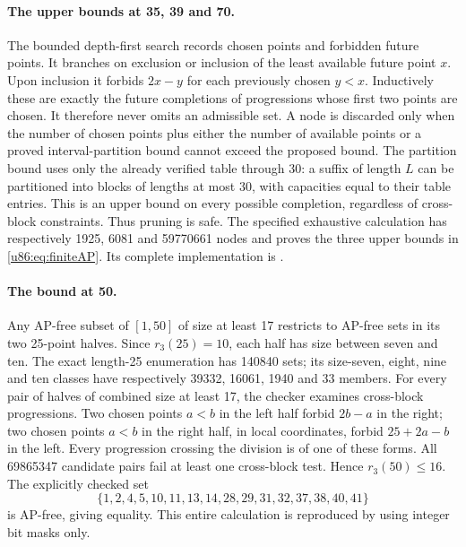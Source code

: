 \documentclass[11pt,a4paper]{article}
\theoremstyle{remark}
\begin{document}
\paragraph{The upper bounds at 35, 39 and 70.}
The bounded depth-first search records chosen points and forbidden
future points. It branches on exclusion or inclusion of the least
available future point $x$. Upon inclusion it forbids $2x-y$ for each
previously chosen $y<x$. Inductively these are exactly the future
completions of progressions whose first two points are chosen. It
therefore never omits an admissible set. A node is discarded only when
the number of chosen points plus either the number of available points
or a proved interval-partition bound cannot exceed the proposed bound.
The partition bound uses only the already verified table through 30:
a suffix of length $L$ can be partitioned into blocks of lengths at
most 30, with capacities equal to their table entries. This is an upper
bound on every possible completion, regardless of cross-block constraints.
Thus pruning is safe. The specified exhaustive calculation has respectively
1925, 6081 and 59770661 nodes and proves the three upper bounds in
\eqref{u86:eq:finiteAP}. Its complete implementation is
.

\paragraph{The bound at 50.}
Any AP-free subset of $[1,50]$ of size at least 17 restricts to AP-free
sets in its two 25-point halves. Since $r_3(25)=10$, each half has size
between seven and ten. The exact length-25 enumeration has 140840
sets; its size-seven, eight, nine and ten classes have respectively
39332, 16061, 1940 and 33 members. For every pair of halves of combined
size at least 17, the checker examines cross-block progressions.
Two chosen points $a<b$ in the left half forbid $2b-a$ in the right;
two chosen points $a<b$ in the right half, in local coordinates, forbid
$25+2a-b$ in the left. Every progression crossing the division is of
one of these forms. All 69865347 candidate pairs fail at least one
cross-block test. Hence $r_3(50)\le16$. The explicitly checked set
\[
 \{1,2,4,5,10,11,13,14,28,29,31,32,37,38,40,41\}
\]
is AP-free, giving equality. This entire calculation is reproduced by
 using integer bit masks only.
\end{document}
